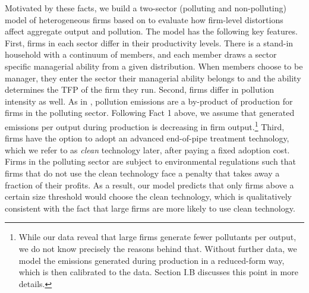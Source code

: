 \documentclass[AEJ]{AEA}
\begin{document}
Motivated by these facts, we build a two-sector (polluting and non-polluting) model of heterogeneous firms based on \citet{Lucas:1978b} to evaluate how firm-level distortions affect aggregate output and pollution. The model has the following key features. First, firms in each sector differ in their productivity levels. There is a stand-in household with a continuum of members, and each member draws a sector specific managerial ability from a given distribution. When members choose to be manager, they enter the sector their managerial ability belongs to and the ability determines the TFP of the firm they run. Second, firms differ in pollution intensity as well. As in \citet{CopelandTaylor:1994}, pollution emissions are a by-product of production for firms in the polluting sector. Following Fact 1 above, we assume that generated emissions per output during production is decreasing in firm output.\footnote{While our data reveal that large firms generate fewer pollutants per output, we do not know precisely the reasons behind that. Without further data, we model the emissions generated during production in a reduced-form way, which is then calibrated to the data. Section I.B discusses this point in more details.} Third, firms have the option to adopt an advanced end-of-pipe treatment technology, which we refer to as \textit{clean} technology later, after paying a fixed adoption cost. Firms in the polluting sector are subject to environmental regulations such that firms that do not use the clean technology face a penalty that takes away a fraction of their profits. As a result, our model predicts that only firms above a certain size threshold would choose the clean technology, which is qualitatively consistent with the fact that large firms are more likely to use clean technology.
\end{document}
